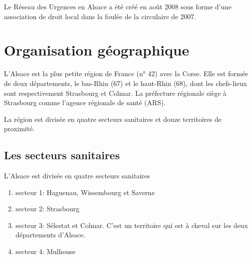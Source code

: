 \documentclass[12pt,english,french,twoside]{book}\usepackage[]{graphicx}\usepackage[]{color}
\begin{document}

Le Réseau des Urgences en Alsace a été créé en août 2008 sous forme d'une association de droit local dans la foulée de la circulaire de 2007.


\cite{16}


\newpage
\chapter{Organisation géographique}


L’Alsace est la plus petite région de France (n° 42) avec la Corse. Elle est formée de deux départements, le bas-Rhin (67) et le haut-Rhin (68), dont les chefs-lieux sont respectivement Strasbourg et Colmar. La préfecture régionale siège à Strasbourg comme l'agence régionale de santé  (ARS).

La région est divisée en quatre secteurs sanitaires et douze territoires de proximité.

\section{Les secteurs sanitaires}

L’Alsace est divisée en quatre secteurs sanitaires
\begin{enumerate}
  \item secteur 1: Haguenau, Wissembourg et Saverne
  \item secteur 2: Strasbourg
  \item secteur 3: Sélestat et Colmar. C'est un territoire qui est à cheval sur les deux départements d'Alsace.
  \item secteur 4: Mulhouse
\end{enumerate}
\end{document}
